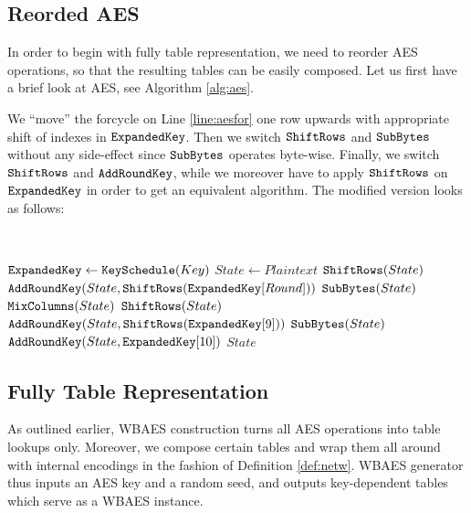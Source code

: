 
\subsection{Reorded AES}

In order to begin with fully table representation, we need to reorder AES operations, so that the resulting tables can be easily composed. Let us first have a brief look at AES, see Algorithm \ref{alg:aes}.

We ``move'' the forcycle on Line \ref{line:aesfor} one row upwards with appropriate shift of indexes in $\texttt{ExpandedKey}$. Then we switch $\texttt{ShiftRows}$ and $\texttt{SubBytes}$ without any side-effect since $\texttt{SubBytes}$ operates byte-wise. Finally, we switch $\texttt{ShiftRows}$ and $\texttt{AddRoundKey}$, while we moreover have to apply $\texttt{ShiftRows}$ on $\texttt{ExpandedKey}$ in order to get an equivalent algorithm. The modified version looks as follows:
\begin{alg}
\label{alg:reordaes}
	~
	\begin{algorithmic}[1]
			\State $\texttt{ExpandedKey} \gets \texttt{KeySchedule}(Key)$
			\State $State \gets Plaintext$
				\State $\texttt{ShiftRows}(State)$
				\State $\texttt{AddRoundKey}(State, \texttt{ShiftRows}(\texttt{ExpandedKey}[Round]))$
				\State $\texttt{SubBytes}(State)$
				\State $\texttt{MixColumns}(State)$
			\EndFor
			\State $\texttt{ShiftRows}(State)$
			\State $\texttt{AddRoundKey}(State, \texttt{ShiftRows}(\texttt{ExpandedKey}[9]))$
			\State $\texttt{SubBytes}(State)$
			\State $\texttt{AddRoundKey}(State, \texttt{ExpandedKey}[10])$
			\State\Return $State$
		\EndFunction
	\end{algorithmic}
\end{alg}



\subsection{Fully Table Representation}

As outlined earlier, WBAES construction turns all AES operations into table lookups only. Moreover, we compose certain tables and wrap them all around with internal encodings in the fashion of Definition \ref{def:netw}. WBAES generator thus inputs an AES key and a random seed, and outputs key-dependent tables which serve as a WBAES instance.

